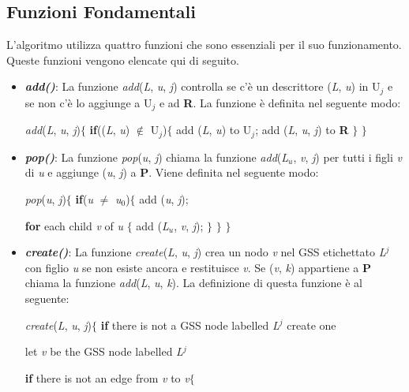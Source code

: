 \subsection{Funzioni Fondamentali}\label{par}
L'algoritmo \cite{pubblicazione: scott} utilizza quattro funzioni che sono essenziali per il suo funzionamento. Queste funzioni vengono elencate qui di seguito.
\begin{itemize}
	\item \textbf{\textit{add()}}: La funzione \textit{add}(\textit{L}, \textit{u}, \textit{j}) controlla se c'è un descrittore (\textit{L}, \textit{u}) in U$_j$ e se non c'è lo aggiunge a U$_j$ e ad \textbf{R}. La funzione è definita nel seguente modo:\par 
	\textit{add}(\textit{L}, \textit{u}, \textit{j})$\{$ \textbf{if}((\textit{L}, \textit{u}) $\notin$ U$_j$)$\{$ add (\textit{L}, \textit{u}) to U$_j$; add (\textit{L}, \textit{u}, \textit{j}) to \textbf{R} $\}$ $\}$
	\item \textbf{\textit{pop()}}: La funzione \textit{pop}(\textit{u}, \textit{j}) chiama la funzione \textit{add}(\textit{L$_u$}, \textit{v}, \textit{j}) per tutti i figli \textit{v} di \textit{u} e aggiunge (\textit{u}, \textit{j}) a \textbf{P}. Viene definita nel seguente modo: \par
	\textit{pop}(\textit{u}, \textit{j})$\{$ \textbf{if}(\textit{u} $\ne$ \textit{u$_0$})$\{$ add (\textit{u}, \textit{j}); \par \hspace{4.1cm}\textbf{for} each child \textit{v} of \textit{u} $\{$ add (\textit{L$_u$}, \textit{v}, \textit{j}); $\}$ $\}$ $\}$
	\item \textbf{\textit{create()}}: La funzione \textit{create}(\textit{L}, \textit{u}, \textit{j}) crea un nodo \textit{v} nel GSS etichettato \textit{L}$^{j}$ con figlio \textit{u} se non esiste ancora e restituisce \textit{v}. Se (\textit{v}, \textit{k}) appartiene a \textbf{P} chiama la funzione \textit{add}(\textit{L}, \textit{u}, \textit{k}). La definizione di questa funzione è al seguente:\par 
	\textit{create}(\textit{L}, \textit{u}, \textit{j})$\{$ \textbf{if} there is not a GSS node labelled \textit{L$^{j}$} create one\par
	\hspace{3cm} let \textit{v} be the GSS node labelled \textit{L$^{j}$} \par
	\hspace{3cm} \textbf{if} there is not an edge from \textit{v} to \textit{v}$\{$ \par

\end{itemize}
